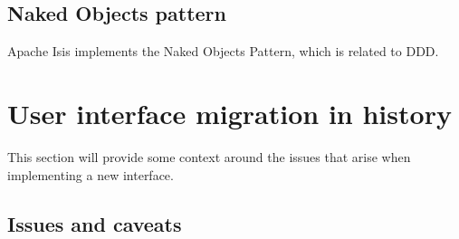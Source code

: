 \subsection{Naked Objects pattern}
\label{subsection:nakedobjectspattern}
Apache Isis implements the Naked Objects Pattern, which is related to DDD.

\section{User interface migration in history}
\label{section:userinterfacemigrationinhistory}
This section will provide some context around the issues that arise when implementing a new interface.

\subsection{Issues and caveats}
\label{subsection:issuesandcaveats}